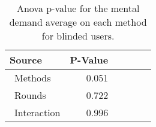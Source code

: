 
\begin{table}[!htb]
\centering
\caption{Anova p-value for the mental demand average on each method for blinded users.}
\label{tab:blocanova_gsr_two_way_blind}
\begin{tabular}{lrrrrl}
\toprule
          Source & P-Value \\
\midrule
    \    Methods &   0.051 \\
     \    Rounds &   0.722 \\
\    Interaction &   0.996 \\
\bottomrule
\end{tabular}
\end{table}

